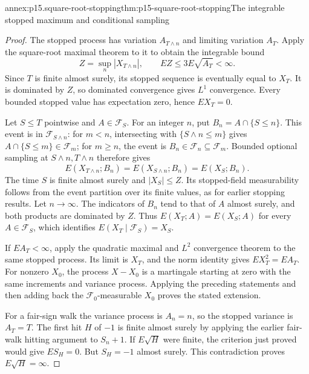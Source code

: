 \begin{annexitem}{annex:p15.square-root-stopping}{thm:p15-square-root-stopping}{The integrable stopped maximum and conditional sampling}
\begin{proof}
The stopped process has variation \(A_{T\wedge n}\) and limiting
variation \(A_T\).
Apply the square-root maximal theorem to it to obtain the
integrable bound
\[
                      Z=\sup_n|X_{T\wedge n}|,\qquad
                      EZ\leq3E\sqrt{A_T}<\infty.
\]
Since \(T\) is finite almost surely, its stopped sequence is
eventually equal to \(X_T\). It is dominated by \(Z\), so
dominated convergence gives \(L^1\) convergence.
Every bounded stopped value has expectation zero, hence \(EX_T=0\).

Let \(S\leq T\) pointwise and \(A\in\mathcal F_S\).
For an integer \(n\), put \(B_n=A\cap\{S\leq n\}\).
This event is in \(\mathcal F_{S\wedge n}\):
for \(m<n\), intersecting with \(\{S\wedge n\leq m\}\)
gives \(A\cap\{S\leq m\}\in\mathcal F_m\);
for \(m\geq n\), the event is \(B_n\in\mathcal F_n\subseteq\mathcal F_m\).
Bounded optional sampling at \(S\wedge n,T\wedge n\) therefore gives
\[
                  E(X_{T\wedge n};B_n)
                           =E(X_{S\wedge n};B_n)=E(X_S;B_n).
\]
The time \(S\) is finite almost surely and \(|X_S|\leq Z\).
Its stopped-field measurability follows from the event partition
over its finite values, as for earlier stopping results.
Let \(n\to\infty\). The indicators of \(B_n\) tend to that of
\(A\) almost surely, and both products are dominated by \(Z\).
Thus \(E(X_T;A)=E(X_S;A)\) for every \(A\in\mathcal F_S\),
which identifies \(E(X_T\mid\mathcal F_S)=X_S\).

If \(EA_T<\infty\), apply the quadratic maximal and \(L^2\)
convergence theorem to the same stopped process.
Its limit is \(X_T\), and the norm identity gives \(EX_T^2=EA_T\).
For nonzero \(X_0\), the process \(X-X_0\) is a martingale
starting at zero with the same increments and variance process.
Applying the preceding statements and then adding back the
\(\mathcal F_0\)-measurable \(X_0\) proves the stated extension.

For a fair-sign walk the variance process is \(A_n=n\),
so the stopped variance is \(A_T=T\).
The first hit \(H\) of \(-1\) is finite almost surely by
applying the earlier fair-walk hitting argument to \(S_n+1\).
If \(E\sqrt H\) were finite, the criterion just proved would
give \(ES_H=0\). But \(S_H=-1\) almost surely.
This contradiction proves \(E\sqrt H=\infty\).
\end{proof}
\end{annexitem}

